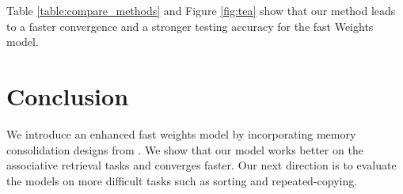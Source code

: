 \documentclass[10pt,letterpaper]{article}
\begin{document}
Table \ref{table:compare_methods} and Figure \ref{fig:tea} show that our method leads to a faster convergence and a stronger testing accuracy for the fast Weights model. 





\section{Conclusion}
We introduce an enhanced fast weights model by incorporating memory consolidation designs from \cite{pld}.
We show that our model works better on the associative retrieval tasks and converges faster.
Our next direction is to evaluate the models on more difficult tasks such as sorting and repeated-copying.




\setlength{\bibleftmargin}{.125in}
\setlength{\bibindent}{-\bibleftmargin}


\end{document}
